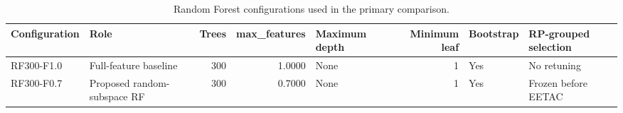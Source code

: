 \begin{table}
\caption{Random Forest configurations used in the primary comparison.}
\label{tab:final_model_configuration}
\begin{tabular}{llrrlrll}
\toprule
Configuration & Role & Trees & max\_features & Maximum depth & Minimum leaf & Bootstrap & RP-grouped selection \\
\midrule
RF300-F1.0 & Full-feature baseline & 300 & 1.0000 & None & 1 & Yes & No retuning \\
RF300-F0.7 & Proposed random-subspace RF & 300 & 0.7000 & None & 1 & Yes & Frozen before EETAC \\
\bottomrule
\end{tabular}
\end{table}

